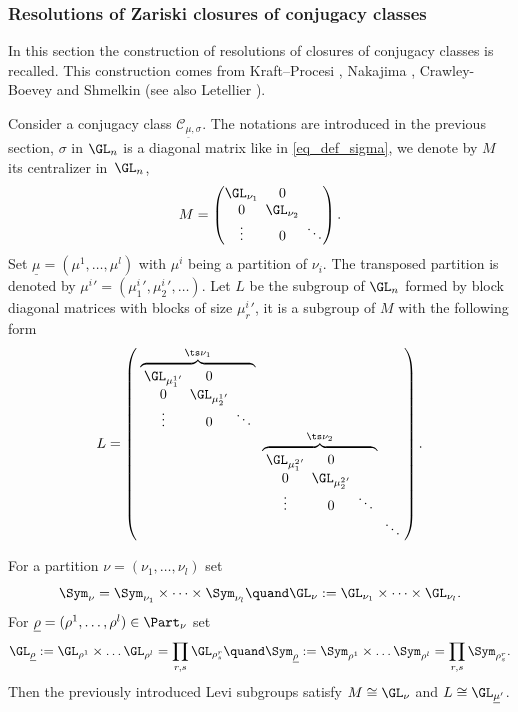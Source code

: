 \subsubsection{Resolutions of Zariski closures of conjugacy classes}\label{subsect_resolution_conjugacy}
In this section the construction of resolutions of closures of conjugacy classes is recalled.
This construction comes from Kraft--Procesi \cite{Kraft_Procesi_80}, Nakajima \cite{Nakajima_1998,Nakajima_01}, Crawley-Boevey \cite{Crawley-Boevey_parabolic, Crawley-Boevey2003} and Shmelkin \cite{Shmelkin2009} (see also Letellier \cite{Letellier_gl}).

Consider a conjugacy class $\mathcal{C}_{\underline{\mu},\sigma}$. The notations are introduced in the previous section, $\sigma$ in $\GL_n$ is a diagonal matrix like in \eqref{eq_def_sigma}, we denote by $M$ its centralizer in~$\GL_n$,
\[\arraycolsep2.5pt
M=\begin{pmatrix}
\GL_{\nu_1} & 0 & \\
0 & \GL_{\nu_2} & \\
\vdots & 0 & \ddots
\end{pmatrix}.
\]
Set $\underline{\mu}=(\mu^{1},\dots,\mu^{l})$ with $\mu^{i}$ being a partition of $\nu_i$. The transposed partition is denoted by ${\mu^{i}}'=({\mu^{i}_1}',{\mu^{i}_2}',\dots) $. Let $L$ be the subgroup of $\GL_n$ formed by block diagonal matrices with blocks of size ${\mu^{i}_r}'$, it is a subgroup of $M$ with the following form
\[\arraycolsep2.5pt
L=\left(
\begin{array}{ccccc}
\overbrace{
\begin{array}{ccccc}
\GL_{{\mu^{1}_1}' } & 0 & \\
0 & \GL_{{\mu^{1}_2}' } & \\
\vdots & 0 & \ddots
\end{array}
}^{\ts\nu_1} & & \\
& \overbrace{
\begin{array}{ccccc}
\GL_{{\mu^{2}_1}' } & 0 & \\
0 & \GL_{{\mu^{2}_2}' } & \\
\vdots & 0 & \ddots
\end{array}
}^{\ts\nu_2} & \\
& & \ddots
\end{array}
\right).
\]
\begin{notations}\label{notations_group_part}
For a partition $\nu=(\nu_1,\dots,\nu_l)$ set
\[
\Sym_{\nu}= \Sym_{\nu_1}\times\dots\times \Sym_{\nu_l} \quand \GL_{\nu}:=\GL_{\nu_1}\times\dots\times\GL_{\nu_l}.
\]
For $\underline{\rho}=(\rho^1,\dots,\rho^l)\in \Part_{\nu}$ set
\[
\GL_{\underline{\rho}}:=\GL_{\rho^1}\times\dots\GL_{\rho^l}=\prod_{r,s}\GL_{\rho^r_s}
\quand\Sym_{\underline{\rho}} :=\Sym_{\rho^1}\times\dots\Sym_{\rho^l}=\prod_{r,s}\Sym_{\rho^r_s}.
\]
Then the previously introduced Levi subgroups satisfy $M\cong \GL_{\nu}$ and $L\cong \GL_{\underline{\mu}'}$.
\end{notations}
